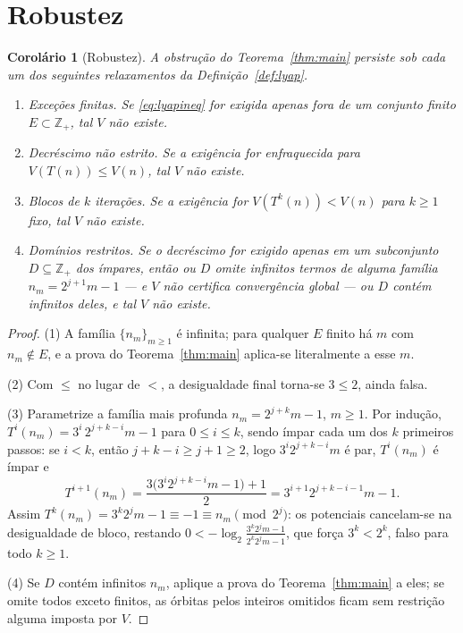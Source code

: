 \documentclass[10pt]{amsart}
\newtheorem{corollary}[theorem]{Corolário}
\theoremstyle{definition}
\theoremstyle{remark}
\newcommand{\Z}{\mathbb{Z}}
\begin{document}
\section{Robustez}

\begin{corollary}[Robustez]\label{cor:robust}
A obstrução do Teorema~\ref{thm:main} persiste sob cada um dos seguintes relaxamentos da Definição~\ref{def:lyap}.
\begin{enumerate}
\item \emph{Exceções finitas.} Se \eqref{eq:lyapineq} for exigida apenas fora de um conjunto finito $E \subset \Z_+$, tal $V$ não existe.
\item \emph{Decréscimo não estrito.} Se a exigência for enfraquecida para $V(T(n)) \le V(n)$, tal $V$ não existe.
\item \emph{Blocos de $k$ iterações.} Se a exigência for $V(T^k(n)) < V(n)$ para $k \ge 1$ fixo, tal $V$ não existe.
\item \emph{Domínios restritos.} Se o decréscimo for exigido apenas em um subconjunto $D \subseteq \Z_+$ dos ímpares, então ou $D$ omite infinitos termos de alguma família $n_m = 2^{j+1}m-1$ --- e $V$ não certifica convergência global --- ou $D$ contém infinitos deles, e tal $V$ não existe.
\end{enumerate}
\end{corollary}

\begin{proof}
(1) A família $\{n_m\}_{m \ge 1}$ é infinita; para qualquer $E$ finito há $m$ com $n_m \notin E$, e a prova do Teorema~\ref{thm:main} aplica-se literalmente a esse $m$.

(2) Com $\le$ no lugar de $<$, a desigualdade final torna-se $3 \le 2$, ainda falsa.

(3) Parametrize a família mais profunda $n_m = 2^{j+k}m - 1$, $m\ge1$. Por indução, $T^i(n_m) = 3^i\, 2^{j+k-i} m - 1$ para $0 \le i \le k$, sendo ímpar cada um dos $k$ primeiros passos: se $i < k$, então $j+k-i \ge j+1 \ge 2$, logo $3^i 2^{j+k-i}m$ é par, $T^i(n_m)$ é ímpar e
\[
T^{i+1}(n_m) = \frac{3\bigl(3^i 2^{j+k-i}m - 1\bigr)+1}{2} = 3^{i+1} 2^{j+k-i-1} m - 1 .
\]
Assim $T^k(n_m) = 3^k 2^j m - 1 \equiv -1 \equiv n_m \pmod{2^j}$: os potenciais cancelam-se na desigualdade de bloco, restando $0 < -\log_2 \frac{3^k 2^j m - 1}{2^k 2^j m - 1}$, que força $3^k < 2^k$, falso para todo $k \ge 1$.

(4) Se $D$ contém infinitos $n_m$, aplique a prova do Teorema~\ref{thm:main} a eles; se omite todos exceto finitos, as órbitas pelos inteiros omitidos ficam sem restrição alguma imposta por $V$.
\end{proof}
\end{document}
